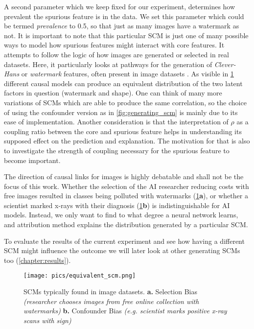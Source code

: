 A second parameter which we keep fixed for our experiment, determines how prevalent the spurious feature is in the data. We set this parameter which could be termed \textit{prevalence} to 0.5, so that just as many images have a watermark as not. It is important to note that this particular SCM is just one of many possible ways to model how spurious features might interact with core features. It attempts to follow the logic of how images are generated or selected in real datasets. Here, it particularly looks at pathways for the generation of \textit{Clever-Hans} or \textit{watermark} features, often present in image datasets \cite{Lapuschkin2019}. As visible in \cref{fig:equivalent_scm} different causal models can produce an equivalent distribution of the two latent factors in question (watermark and shape). One can think of many more variations of SCMs which are able to produce the same correlation, so the choice of using the confounder version as in \cref{fig:generating_scm} is mainly due to its ease of implementation. Another consideration is that the interpretation of $\rho$ as a coupling ratio between the core and spurious feature helps in understanding its supposed effect on the prediction and explanation. The motivation for that is also to investigate the strength of coupling necessary for the spurious feature to become important. 

The direction of causal links for images is highly debatable and shall not be the focus of this work. Whether the selection of the AI researcher reducing costs with free images resulted in classes being polluted with watermarks (\cref{fig:equivalent_scm}\textbf{a}), or whether a scientist marked x-rays with their diagnosis (\cref{fig:equivalent_scm}\textbf{b}) is indistinguishable for AI models. 
Instead, we only want to find to what degree a neural network learns, and attribution method explains the distribution generated by a particular SCM.

To evaluate the results of the current experiment and see how having a different SCM might influence the outcome we will later look at other generating SCMs too (\cref{chapter:results}).

\begin{figure}[H]
    \centering
    \texttt{[image: pics/equivalent\_scm.png]}
    \caption{SCMs typically found in image datasets.
    \textbf{a.} Selection Bias \textit{(researcher chooses images from free online collection with watermarks)}
    \textbf{b.} Confounder Bias \textit{(e.g. scientist marks positive x-ray scans with sign)}}
    \label{fig:equivalent_scm}
\end{figure}

